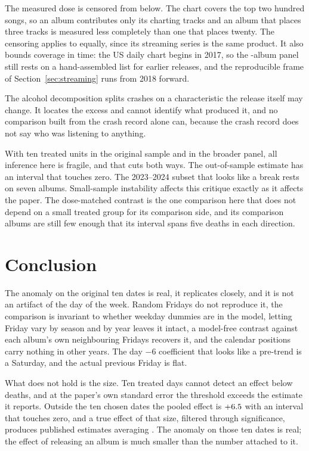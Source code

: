 \documentclass[11pt]{article}
\begin{document}
The measured dose is censored from below. The chart covers the top two hundred songs, so an album
contributes only its charting tracks and an album that places three tracks is measured less
completely than one that places twenty. The censoring applies to \citet{patel2026smartphones}
equally, since its streaming series is the same product. It also bounds coverage in time: the US
daily chart begins in 2017, so the \numNAllAlbums{}-album panel still rests on a hand-assembled
list for earlier releases, and the reproducible frame of Section~\ref{sec:streaming} runs from
2018 forward.

The alcohol decomposition splits crashes on a characteristic the release itself may change. It
locates the excess and cannot identify what produced it, and no comparison built from the crash
record alone can, because the crash record does not say who was listening to anything.

With ten treated units in the original sample and \numNAllAlbums{} in the broader panel, all
inference here is fragile, and that cuts both ways. The out-of-sample estimate has an interval
that touches zero. The 2023--2024 subset that looks like a break rests on seven albums.
Small-sample instability affects this critique exactly as it affects the paper. The
dose-matched contrast is the one comparison here that does not depend on a small treated group
for its comparison side, and its \numNDoseMatched{} comparison albums are still few enough that
its interval spans five deaths in each direction.

\section{Conclusion}

The anomaly on the original ten dates is real, it replicates closely, and it is not an artifact of
the day of the week. Random Fridays do not reproduce it, the comparison is invariant to whether
weekday dummies are in the model, letting Friday vary by season and by year leaves it intact, a
model-free contrast against each album's own neighbouring Fridays recovers it, and the calendar
positions carry nothing in other years. The day $-6$ coefficient that looks like a pre-trend is a
Saturday, and the actual previous Friday is flat.

What does not hold is the size. Ten treated days cannot detect an effect below \numMDEEighty{}
deaths, and at the paper's own standard error the threshold exceeds the estimate it reports.
Outside the ten chosen dates the pooled effect is $+6.5$ with an interval that
touches zero, and a true effect of that size, filtered through significance, produces published
estimates averaging \numMeanPublishedAtOutside{}. The anomaly on those ten dates is real; the
effect of releasing an album is much smaller than the number attached to it.
\end{document}

